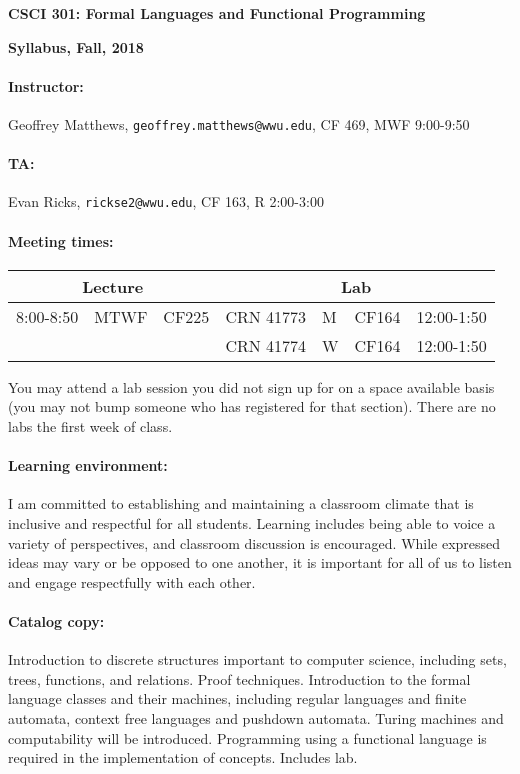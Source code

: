 \documentclass{article}
\begin{document}
\centerline{\Large\bf CSCI 301: Formal Languages and Functional Programming}
\centerline{\large\bf Syllabus, Fall, 2018}

\paragraph{Instructor:}
Geoffrey Matthews,
{\tt geoffrey.matthews@wwu.edu}, CF 469, MWF 9:00-9:50

\paragraph{TA:} Evan Ricks, {\tt rickse2@wwu.edu}, CF 163, R 2:00-3:00

\paragraph{Meeting times:} 

  \begin{tabular}{lll|llll}
    \multicolumn{3}{c|}{Lecture}
    &\multicolumn{4}{|c}{Lab}
    \\\hline
 8:00-8:50& MTWF & CF225 &  CRN 41773  &M& CF164 & 12:00-1:50
    \\
& &  & CRN 41774&  W & CF164 & 12:00-1:50 
    \\\hline
    \end{tabular}
	
  You may attend a lab session you did not sign up for on a space
  available basis (you may not bump someone who has registered for
  that section).  There are no labs the first week of class.

\paragraph{Learning environment:}
  I am committed to establishing and maintaining a classroom climate that is
  inclusive and respectful for all students.  Learning includes being able to
  voice a variety of perspectives, and classroom discussion is encouraged. While
  expressed ideas may vary or be opposed to one another, it is important for all
  of us to listen and engage respectfully with each other.


\paragraph{Catalog copy:} Introduction to discrete structures important to
  computer science, including sets, trees, functions, and
  relations. Proof techniques. Introduction to the formal language
  classes and their machines, including regular languages and finite
  automata, context free languages and pushdown automata. Turing
  machines and computability will be introduced. Programming using a
  functional language is required in the implementation of
  concepts. Includes lab.
\end{document}
